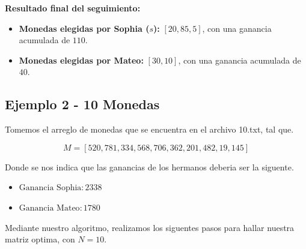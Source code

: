 \textbf{Resultado final del seguimiento:}
\begin{itemize}
    \item \textbf{Monedas elegidas por Sophia ($s$):} $[20, 85, 5]$, con una ganancia acumulada de $110$.
    \item \textbf{Monedas elegidas por Mateo:} $[30, 10]$, con una ganancia acumulada de $40$.
\end{itemize}

\subsection{Ejemplo 2 - 10 Monedas}

Tomemos el arreglo de monedas que se encuentra en el archivo 10.txt, tal que.

\[
M = [520, 781, 334, 568, 706, 362, 201, 482, 19, 145]
\]

Donde se nos indica que las ganancias de los hermanos deberia ser la siguente.

\begin{itemize}
    \item $\text{Ganancia Sophia}: 2338$
    \item $\text{Ganancia Mateo}: 1780$
\end{itemize}

Mediante nuestro algoritmo, realizamos los siguentes pasos para hallar nuestra matriz optima, con $N = 10$.

